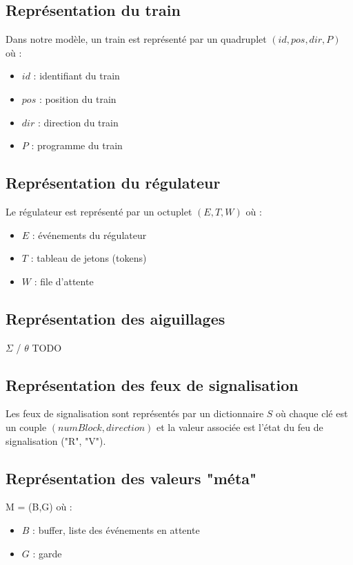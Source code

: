 \documentclass[12pt]{article}
\begin{document}
\subsection{Représentation du train}
Dans notre modèle, un train est représenté par un quadruplet $(id, pos, dir, P)$ où :
\begin{itemize}
    \item $id$ : identifiant du train
    \item $pos$ : position du train 
    \item $dir$ : direction du train
    \item $P$ : programme du train
\end{itemize}

\subsection{Représentation du régulateur}
Le régulateur est représenté par un octuplet $(E, T, W)$ où :
\begin{itemize}
    \item $E$ : événements du régulateur
    \item $T$ : tableau de jetons (tokens)
    \item $W$ : file d'attente
\end{itemize}

\subsection{Représentation des aiguillages}
$\Sigma$ / $\theta$ TODO

\subsection{Représentation des feux de signalisation}
Les feux de signalisation sont représentés par un dictionnaire $S$ où chaque clé
est un couple $(numBlock, direction)$ et la valeur associée est l'état du feu de signalisation ("R", "V").

\subsection{Représentation des valeurs "méta"}
M = (B,G) où :
\begin{itemize}
    \item $B$ : buffer, liste des événements en attente
    \item $G$ : garde
\end{itemize}
\end{document}
